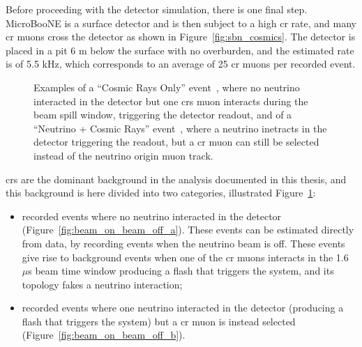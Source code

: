 Before proceeding with the detector simulation, there is one final step. MicroBooNE is a surface detector and is then subject to a high \acrshort{cr} rate, and many \acrshort{cr} muons cross the detector as shown in Figure~\ref{fig:sbn_cosmics}. The detector is placed in a pit 6 m below the surface with no overburden, and the estimated rate is of 5.5 kHz, which corresponds to an average of 25 \acrshort{cr} muons per recorded event. 
%
\begin{figure}[]
\centering
{} 
\caption[``Cosmic Rays Only'' and ``Neutrino + Cosmic Rays'' Event Examples]{Examples of a ``Cosmic Rays Only'' event~\protect{}, where no neutrino interacted in the detector but one \acrshort{cr}s muon interacts during the beam spill window, triggering the detector readout, and of a ``Neutrino + Cosmic Rays'' event~\protect{}, where a neutrino inetracts in the detector triggering the readout, but a \acrshort{cr} muon can still be selected instead of the neutrino origin muon track.}
\label{fig:beam_on_beam_off}
\end{figure}
%
\acrshort{cr}s are the dominant background in the analysis documented in this thesis, and this background is here divided into two categories, illustrated Figure~\ref{fig:beam_on_beam_off}: 
\begin{itemize}
\item recorded events where no neutrino interacted in the detector (Figure~\ref{fig:beam_on_beam_off_a}). These events can be estimated directly from data, by recording events when the neutrino beam is off. These events give rise to background events when one of the \acrshort{cr} muons interacts in the 1.6 $\mu$s beam time window producing a flash that triggers the system, and its topology fakes a neutrino interaction;
\item recorded events where one neutrino interacted in the detector (producing a flash that triggers the system) but a \acrshort{cr} muon is instead selected (Figure~\ref{fig:beam_on_beam_off_b}).
\end{itemize}
